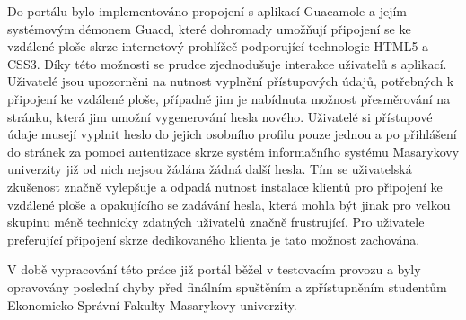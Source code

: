 Do portálu bylo implementováno propojení s aplikací Guacamole a jejím systémovým démonem Guacd, které dohromady umožňují připojení se ke vzdálené ploše skrze internetový prohlížeč podporující technologie HTML5 a CSS3. Díky této možnosti se prudce zjednodušuje interakce uživatelů s aplikací. Uživatelé jsou upozorněni na nutnost vyplnění přístupových údajů, potřebných k připojení ke vzdálené ploše, případně jim je nabídnuta možnost přesměrování na stránku, která jim umožní vygenerování hesla nového. Uživatelé si přístupové údaje musejí vyplnit heslo do jejich osobního profilu pouze jednou a po přihlášení do stránek za pomoci autentizace skrze systém informačního systému Masarykovy univerzity již od nich nejsou žádána žádná další hesla. Tím se uživatelská zkušenost značně vylepšuje a odpadá nutnost instalace klientů pro připojení ke vzdálené ploše a opakujícího se zadávání hesla, která mohla být jinak pro velkou skupinu méně technicky zdatných uživatelů značně frustrující. Pro uživatele preferující připojení skrze dedikovaného klienta je tato možnost zachována.

V době vypracování této práce již portál běžel v testovacím provozu a byly opravovány poslední chyby před finálním spuštěním a zpřístupněním studentům Ekonomicko Správní Fakulty Masarykovy univerzity.
